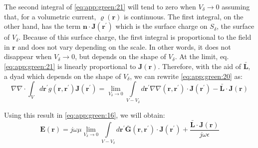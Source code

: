 			The second integral of \eqref{eq:app:green:21} will tend to zero when $V_\delta\rightarrow0$ assuming that, for a volumetric current, $\varrho(\mathbf{r})$ is continuous. The first integral, on the other hand, has the term $\mathbf{n}\cdot\mathbf{J}(\mathbf{r^\prime})$ which is the surface charge on $S_{\delta}$, the surface of $V_\delta$. Because of this surface charge, the first integral is proportional to the field in $\mathbf{r}$ and does not vary depending on the scale. In other words, it does not disappear when $V_\delta\rightarrow0$, but depends on the shape of $V_\delta$. At the limit, eq.\eqref{eq:app:green:21} is linearly proportional to $\mathbf{J}(\mathbf{r})$. Therefore, with the aid of $\mathbf{\bar{L}}$, a dyad which depends on the shape of $V_\delta$, we can rewrite \eqref{eq:app:green:20} as:
			\begin{equation}
				\nabla\nabla\cdot\int_V d\mathbf{r^\prime} g(\mathbf{r},\mathbf{r^\prime})\mathbf{J}(\mathbf{r^\prime}) = \lim\limits_{V_\delta\rightarrow0}\int\limits_{V-V_\delta}d\mathbf{r^\prime}\nabla\nabla(\mathbf{r},\mathbf{r^\prime})\cdot\mathbf{J}(\mathbf{r^\prime})-\mathbf{\bar{L}}\cdot\mathbf{J}(\mathbf{r}) \label{eq:app:green:22}
			\end{equation}
		
			Using this result in \eqref{eq:app:green:16}, we will obtain:
			\begin{equation}
				\mathbf{E}(\mathbf{r}) = j\omega\mu\lim\limits_{V_\delta\rightarrow0}\int\limits_{V-V_\delta}d\mathbf{r^\prime}\mathbf{\bar{G}}(\mathbf{r}, \mathbf{r^\prime})\cdot\mathbf{J}(\mathbf{r^\prime}) + \frac{\mathbf{\bar{L}}\cdot\mathbf{J}(\mathbf{r})}{j\omega\epsilon} \label{eq:app:green:23}
			\end{equation}
		

